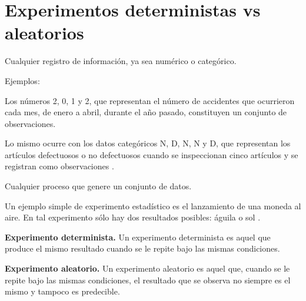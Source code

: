 
\section{Experimentos deterministas vs aleatorios}


\begin{tcolorbox}[colback=gray!5!white,colframe=gray!60!black,title=Definición: Observación]
    Cualquier registro de informaci\'on, ya sea num\'erico o categ\'orico.
\end{tcolorbox}

Ejemplos: 

Los n\'umeros 2, 0, 1 y 2, que representan el n\'umero de accidentes que
ocurrieron cada mes, de enero a abril, durante el a\~no pasado, constituyen un
conjunto de observaciones. 

Lo mismo ocurre con los datos categ\'oricos N, D, N, N y D, que representan los
art\'iculos defectuosos o no defectuosos cuando se inspeccionan cinco
art\'iculos y se registran como observaciones \cite{walpole2012probabilidad}.

\begin{tcolorbox}[colback=gray!5!white,colframe=gray!60!black,title=Definición: Experimento]
    Cualquier proceso que genere un conjunto de datos.    
\end{tcolorbox}

Un ejemplo simple de experimento estad\'istico es el lanzamiento de una moneda
al aire. En tal experimento s\'olo hay dos resultados posibles: águila o sol
\cite{walpole2012probabilidad}.

\begin{tcolorbox}[colback=gray!5!white,colframe=gray!60!black,title=Definición: Tipos de experimentos]

    \textbf{Experimento determinista.}
    Un experimento determinista es aquel que produce el mismo resultado cuando se le
    repite bajo las mismas condiciones.

    \tcblower

    \textbf{Experimento aleatorio.}
    Un experimento aleatorio es aquel que, cuando se le repite bajo las mismas
    condiciones, el resultado que se observa no siempre es el mismo y tampoco es
    predecible.
\end{tcolorbox}

